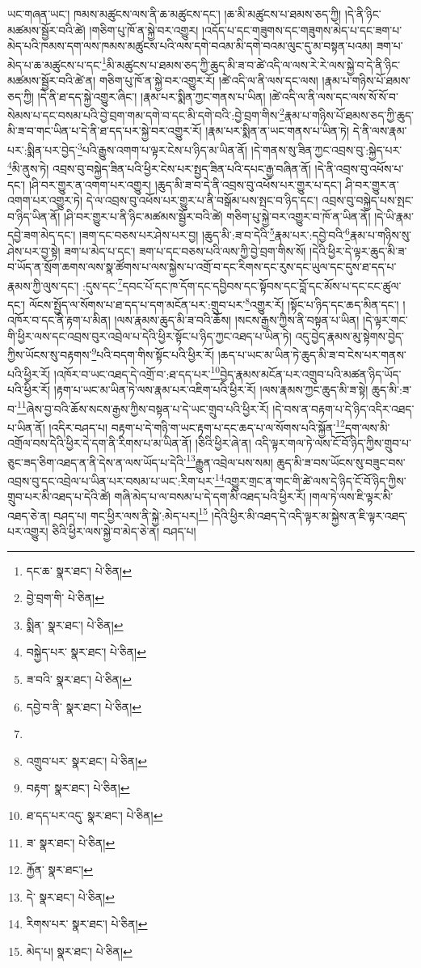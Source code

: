 ཡང་གཞན་ཡང་། ཁམས་མཚུངས་ལས་ནི་ཆ་མཚུངས་དང་། །ཆ་མི་མཚུངས་པ་ཐམས་ཅད་ཀྱི། །དེ་ནི་ཉིང་མཚམས་སྦྱོར་བའི་ཚེ། །གཅིག་པུ་ཁོ་ན་སྐྱེ་བར་འགྱུར། །འདོད་པ་དང་གཟུགས་དང་གཟུགས་མེད་པ་དང་ཟག་པ་མེད་པའི་ཁམས་དག་ལས་ཁམས་མཚུངས་པའི་ལས་དགེ་བའམ་མི་དགེ་བའམ་ལུང་དུ་མ་བསྟན་པའམ། ཟག་པ་མེད་པ་ཆ་མཚུངས་པ་དང་\footnote{དང་ཆ་  སྣར་ཐང་།  པེ་ཅིན། }མི་མཚུངས་པ་ཐམས་ཅད་ཀྱི་ཆུད་མི་ཟ་བ་ཚེ་འདི་ལ་ལས་རེ་རེ་ལས་སྐྱེ་བ་དེ་ནི་ཉིང་མཚམས་སྦྱོར་བའི་ཚེ་ན། གཅིག་པུ་ཁོ་ན་སྐྱེ་བར་འགྱུར་རོ། །ཚེ་འདི་ལ་ནི་ལས་དང་ལས། །རྣམ་པ་གཉིས་པོ་ཐམས་ཅད་ཀྱི། །དེ་ནི་ཐ་དད་སྐྱེ་འགྱུར་ཞིང་། །རྣམ་པར་སྨིན་ཀྱང་གནས་པ་ཡིན། །ཚེ་འདི་ལ་ནི་ལས་དང་ལས་སོ་སོ་བ་སེམས་པ་དང་བསམ་པའི་བྱེ་བྲག་གམ་དགེ་བ་དང་མི་དགེ་བའི་:བྱེ་བྲག་གིས་\footnote{བྱེ་བྲག་གི་  པེ་ཅིན། }རྣམ་པ་གཉིས་པོ་ཐམས་ཅད་ཀྱི་ཆུད་མི་ཟ་བ་གང་ཡིན་པ་དེ་ནི་ཐ་དད་པར་སྐྱེ་བར་འགྱུར་རོ། །རྣམ་པར་སྨིན་ན་ཡང་གནས་པ་ཡིན་ཏེ། དེ་ནི་ལས་རྣམ་པར་:སྨིན་པར་བྱེད་\footnote{སྨིན་  སྣར་ཐང་།  པེ་ཅིན། }པའི་རྒྱུས་འགག་པ་ལྟར་ངེས་པ་ཉིད་མ་ཡིན་ནོ། །དེ་གནས་སུ་ཟིན་ཀྱང་འབྲས་བུ་:སྐྱེད་པར་\footnote{བསྐྱེད་པར་  སྣར་ཐང་།  པེ་ཅིན། }མི་ནུས་ཏེ། འབྲས་བུ་བསྐྱེད་ཟིན་པའི་ཕྱིར་ངེས་པར་སྤྱད་ཟིན་པའི་དཔང་རྒྱ་བཞིན་ནོ། །དེ་ནི་འབྲས་བུ་འཕོས་པ་དང་། །ཤི་བར་གྱུར་ན་འགག་པར་འགྱུར། །ཆུད་མི་ཟ་བ་དེ་ནི་འབྲས་བུ་འཕོས་པར་གྱུར་པ་དང་། ཤི་བར་གྱུར་ན་འགག་པར་འགྱུར་ཏེ། དེ་ལ་འབྲས་བུ་འཕོས་པར་གྱུར་པ་ནི་བསྒོམ་པས་སྤང་བ་ཉིད་དང་། འབྲས་བུ་བསྐྱེད་པས་སྤང་བ་ཉིད་ཡིན་ནོ། །ཤི་བར་གྱུར་པ་ནི་ཉིང་མཚམས་སྦྱོར་བའི་ཚེ། གཅིག་པུ་སྐྱེ་བར་འགྱུར་བ་ཁོ་ན་ཡིན་ནོ། །དེ་ཡི་རྣམ་དབྱེ་ཟག་མེད་དང་། །ཟག་དང་བཅས་པར་ཤེས་པར་བྱ། །ཆུད་མི་:ཟ་བ་དེའི་\footnote{ཟ་བའི་  སྣར་ཐང་།  པེ་ཅིན། }རྣམ་པར་:དབྱེ་བའི་\footnote{དབྱེ་བ་ནི་  སྣར་ཐང་།  པེ་ཅིན། }རྣམ་པ་གཉིས་སུ་ཤེས་པར་བྱ་སྟེ། ཟག་པ་མེད་པ་དང་། ཟག་པ་དང་བཅས་པའི་ལས་ཀྱི་བྱེ་བྲག་གིས་སོ། །དེའི་ཕྱིར་དེ་ལྟར་ཆུད་མི་ཟ་བ་ཡོད་ན་སྲོག་ཆགས་ལས་སྣ་ཚོགས་པ་ལས་སྐྱེས་པ་འགྲོ་བ་དང་རིགས་དང་རུས་དང་ཡུལ་དང་དུས་ཐ་དད་པ་རྣམས་ཀྱི་ལུས་དང་། :དུས་དང་\footnote{}དབང་པོ་དང་ཁ་དོག་དང་དབྱིབས་དང་སྟོབས་དང་བློ་དང་མོས་པ་དང་ངང་ཚུལ་དང་། ལོངས་སྤྱོད་ལ་སོགས་པ་ཐ་དད་པ་དག་མངོན་པར་:གྲུབ་པར་\footnote{འགྲུབ་པར་  སྣར་ཐང་།  པེ་ཅིན། }འགྱུར་རོ། །སྟོང་པ་ཉིད་དང་ཆད་མིན་དང་། །འཁོར་བ་དང་ནི་རྟག་པ་མིན། །ལས་རྣམས་ཆུད་མི་ཟ་བའི་ཆོས། །སངས་རྒྱས་ཀྱིས་ནི་བསྟན་པ་ཡིན། །དེ་ལྟར་གང་གི་ཕྱིར་ལས་དང་འབྲས་བུར་འབྲེལ་པ་དེའི་ཕྱིར་སྟོང་པ་ཉིད་ཀྱང་འཐད་པ་ཡིན་ཏེ། འདུ་བྱེད་རྣམས་མུ་སྟེགས་བྱེད་ཀྱིས་ཡོངས་སུ་བརྟགས་\footnote{བརྟག་  སྣར་ཐང་།  པེ་ཅིན། }པའི་བདག་གིས་སྟོང་པའི་ཕྱིར་རོ། །ཆད་པ་ཡང་མ་ཡིན་ཏེ་ཆུད་མི་ཟ་བ་ངེས་པར་གནས་པའི་ཕྱིར་རོ། །འཁོར་བ་ཡང་འཐད་དེ་འགྲོ་བ་:ཐ་དད་པར་\footnote{ཐ་དད་པར་འདུ་  སྣར་ཐང་།  པེ་ཅིན། }བྱེད་རྣམས་མངོན་པར་འགྲུབ་པའི་མཚན་ཉིད་ཡོད་པའི་ཕྱིར་རོ། །རྟག་པ་ཡང་མ་ཡིན་ཏེ་ལས་རྣམ་པར་འཇིག་པའི་ཕྱིར་རོ། །ལས་རྣམས་ཀྱང་ཆུད་མི་ཟ་སྟེ། ཆུད་མི་:ཟ་བ་\footnote{ཟ་  སྣར་ཐང་།  པེ་ཅིན། }ཞེས་བྱ་བའི་ཆོས་སངས་རྒྱས་ཀྱིས་བསྟན་པ་དེ་ཡང་གྲུབ་པའི་ཕྱིར་རོ། །དེ་བས་ན་བརྟག་པ་དེ་ཉིད་འདིར་འཐད་པ་ཡིན་ནོ། །འདིར་བཤད་པ། བརྟག་པ་དེ་གཉི་ག་ཡང་རྟག་པ་དང་ཆད་པ་ལ་སོགས་པའི་སྐྱོན་\footnote{རྐྱོན་  སྣར་ཐང་། }དག་ལས་མི་འགྲོལ་བས་དེའི་ཕྱིར་དེ་དག་ནི་རིགས་པ་མ་ཡིན་ནོ། །ཅིའི་ཕྱིར་ཞེ་ན། འདི་ལྟར་གལ་ཏེ་ལས་ངོ་བོ་ཉིད་ཀྱིས་གྲུབ་པ་ཅུང་ཟད་ཅིག་འཐད་ན་ནི་དེས་ན་ལས་ཡོད་པ་དེའི་\footnote{དེ་  སྣར་ཐང་།  པེ་ཅིན། }རྒྱུན་འབྲེལ་པས་སམ། ཆུད་མི་ཟ་བས་ཡོངས་སུ་བཟུང་བས་འབྲས་བུ་དང་འབྲེལ་པ་ཡིན་པར་བསམ་པ་ཡང་:རིག་པར་\footnote{རིགས་པར་  སྣར་ཐང་།  པེ་ཅིན། }འགྱུར་གྲང་ན་གང་གི་ཚེ་ལས་དེ་ཉིད་ངོ་བོ་ཉིད་ཀྱིས་གྲུབ་པར་མི་འཐད་པ་དེའི་ཚེ། གཞི་མེད་པ་ལ་བསམ་པ་དེ་དག་མི་འཐད་པའི་ཕྱིར་རོ། །གལ་ཏེ་ལས་ཇི་ལྟར་མི་འཐད་ཅེ་ན། བཤད་པ། གང་ཕྱིར་ལས་ནི་སྐྱེ་:མེད་པར།\footnote{མེད་པ།  སྣར་ཐང་།  པེ་ཅིན། } །དེའི་ཕྱིར་མི་འཐད་དེ་འདི་ལྟར་མ་སྐྱེས་ན་ཇི་ལྟར་འཐད་པར་འགྱུར། ཅིའི་ཕྱིར་ལས་སྐྱེ་བ་མེད་ཅེ་ན། བཤད་པ། 
